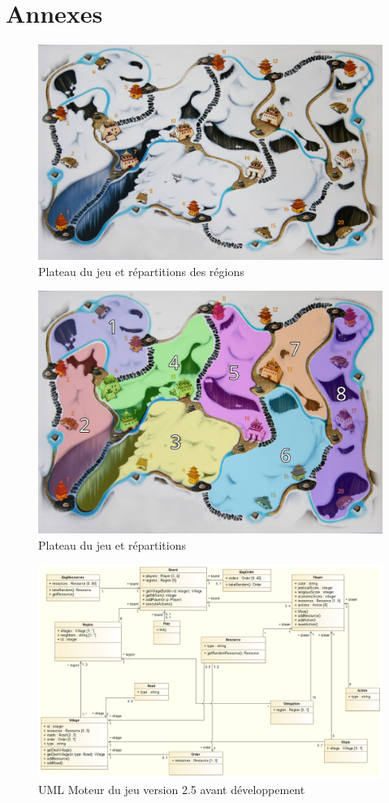 \section{Annexes}
\begin{figure}[h]
	\centering
	\includegraphics[width=0.7\linewidth]{images/plateau}
	\caption{Plateau du jeu et répartitions des régions}
	\label{fig:plateau}
\end{figure}
\begin{figure}[ht]
	\centering
	\includegraphics[width=0.7\linewidth]{images/board_regions}
	\caption{Plateau du jeu et répartitions}
	\label{fig:board_region}
\end{figure}
\begin{figure}[ht]
	\centering
	\includegraphics[width=1\linewidth]{images/UML_Himalaya_2}
	\caption{UML Moteur du jeu version 2.5 avant développement}
	\label{fig:UMLCore1}
\end{figure}
